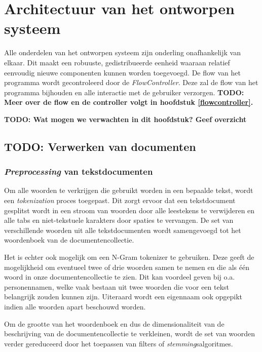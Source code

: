 \chapter{Architectuur van het ontworpen systeem}

Alle onderdelen van het ontworpen systeem zijn onderling onafhankelijk van elkaar. Dit maakt een robuuste, gedistribueerde eenheid waaraan relatief eenvoudig nieuwe componenten kunnen worden toegevoegd. De flow van het programma wordt gecontroleerd door de \textit{FlowController}. Deze zal de flow van het programma bijhouden en alle interactie met de gebruiker verzorgen. 
\textbf{TODO: Meer over de flow en de controller volgt in hoofdstuk \ref{flowcontroller}.}

\textbf{TODO: Wat mogen we verwachten in dit hoofdstuk? Geef overzicht}


\section{TODO: Verwerken van documenten} 
\subsection{\textit{Preprocessing} van tekstdocumenten}\label{bag-of-words}
Om alle woorden te verkrijgen die gebruikt worden in een bepaalde tekst, wordt een \textit{tokenization}\label{tokenization} proces toegepast. Dit zorgt ervoor dat een tekstdocument gesplitst wordt in een stroom van woorden door alle leestekens te verwijderen en alle tabs en niet-tekstuele karakters door spaties te vervangen. De set van verschillende woorden uit alle tekstdocumenten wordt samengevoegd tot het woordenboek van de documentencollectie. 

Het is echter ook mogelijk om een N-Gram tokenizer \cite{McNamee2004} te gebruiken. Deze geeft de mogelijkheid om eventueel twee of drie woorden samen te nemen en die als \'e\'en woord in onze documentencollectie te zien. Dit kan voordeel geven bij o.a. personennamen, welke vaak bestaan uit twee woorden die voor een tekst belangrijk zouden kunnen zijn. Uiteraard wordt een eigennaam ook opgepikt indien alle woorden apart beschouwd worden.

Om de grootte van het woordenboek en dus de dimensionaliteit van de beschrijving van de documentencollectie te verkleinen, wordt de set van woorden verder gereduceerd door het toepassen van filters of \textit{stemming}salgoritmes. 

